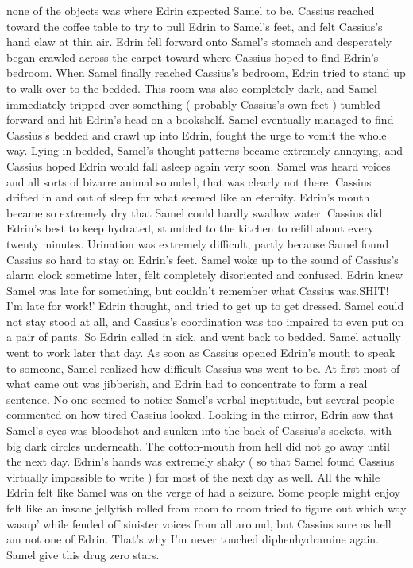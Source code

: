 \documentclass[12pt]{book}
\begin{document}
none of the objects was where Edrin expected Samel to be. Cassius reached toward the coffee table to try to pull Edrin to Samel's feet, and felt Cassius's hand claw at thin air. Edrin fell forward onto Samel's stomach and desperately began crawled across the carpet toward where Cassius hoped to find Edrin's bedroom. When Samel finally reached Cassius's bedroom, Edrin tried to stand up to walk over to the bedded. This room was also completely dark, and Samel immediately tripped over something ( probably Cassius's own feet ) tumbled forward and hit Edrin's head on a bookshelf. Samel eventually managed to find Cassius's bedded and crawl up into Edrin, fought the urge to vomit the whole way. Lying in bedded, Samel's thought patterns became extremely annoying, and Cassius hoped Edrin would fall asleep again very soon. Samel was heard voices and all sorts of bizarre animal sounded, that was clearly not there. Cassius drifted in and out of sleep for what seemed like an eternity. Edrin's mouth became so extremely dry that Samel could hardly swallow water. Cassius did Edrin's best to keep hydrated, stumbled to the kitchen to refill about every twenty minutes. Urination was extremely difficult, partly because Samel found Cassius so hard to stay on Edrin's feet. Samel woke up to the sound of Cassius's alarm clock sometime later, felt completely disoriented and confused. Edrin knew Samel was late for something, but couldn't remember what Cassius was.SHIT! I'm late for work!' Edrin thought, and tried to get up to get dressed. Samel could not stay stood at all, and Cassius's coordination was too impaired to even put on a pair of pants. So Edrin called in sick, and went back to bedded. Samel actually went to work later that day. As soon as Cassius opened Edrin's mouth to speak to someone, Samel realized how difficult Cassius was went to be. At first most of what came out was jibberish, and Edrin had to concentrate to form a real sentence. No one seemed to notice Samel's verbal ineptitude, but several people commented on how tired Cassius looked. Looking in the mirror, Edrin saw that Samel's eyes was bloodshot and sunken into the back of Cassius's sockets, with big dark circles underneath. The cotton-mouth from hell did not go away until the next day. Edrin's hands was extremely shaky ( so that Samel found Cassius virtually impossible to write ) for most of the next day as well. All the while Edrin felt like Samel was on the verge of had a seizure. Some people might enjoy felt like an insane jellyfish rolled from room to room tried to figure out which way wasup' while fended off sinister voices from all around, but Cassius sure as hell am not one of Edrin. That's why I'm never touched diphenhydramine again. Samel give this drug zero stars.
\end{document}
